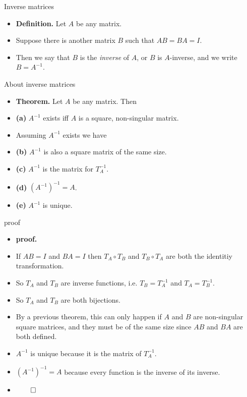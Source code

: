 \documentclass{beamer}
\begin{document}
\begin{frame}{Inverse matrices}

\begin{itemize}
\item \textbf{Definition.} Let $A$ be any matrix.
\item Suppose there is another matrix $B$ such that $AB = BA = I$.
\item Then we say that $B$ is the \emph{inverse} of $A$, or $B$ is $A$-inverse,
and we write $B=A^{-1}$.
\end{itemize}
\end{frame}

\begin{frame}{About inverse matrices}

\begin{itemize}
\item \textbf{Theorem.} Let $A$ be any matrix. Then
\item \textbf{(a)} $A^{-1}$ exists iff $A$ is a square, non-singular matrix.
\item Assuming $A^{-1}$ exists we have
\item \textbf{(b)} $A^{-1}$ is also a square matrix of the same size.
\item \textbf{(c)} $A^{-1}$ is the matrix for $T^{-1}_A$.
\item \textbf{(d)} $\left(A^{-1}\right)^{-1} = A$.
\item \textbf{(e)} $A^{-1}$ is unique.
\end{itemize}
\end{frame}

\begin{frame}{proof}

\begin{itemize}
\item \textbf{proof.}
\item If $AB=I$ and $BA=I$ then $T_A\circ T_B$ and $T_B\circ T_A$ are both
the identitiy transformation.
\item So $T_A$ and $T_B$ are inverse functions, i.e. $T_B = T_A^{-1}$ and $T_A=T_B^{-1}$.
\item So $T_A$ and $T_B$ are both bijections.
\item By a previous theorem, this can only happen if $A$ and $B$ are non-singular
square matrices, and they must be of the same size since $AB$ and $BA$ are both defined.
\item $A^{-1}$ is unique because it is the matrix of $T_A^{-1}$.
\item $\left(A^{-1}\right)^{-1} = A$ because every function is the inverse of its inverse.
\item $\qed$
\end{itemize}
\end{frame}
\end{document}
